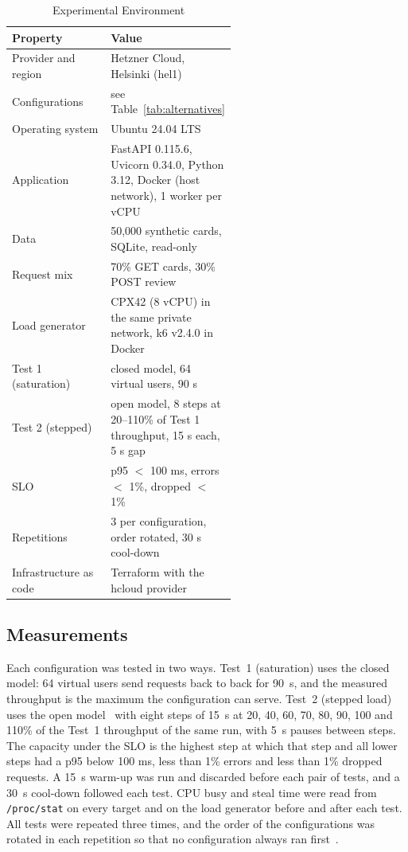 \documentclass[conference,a4paper]{IEEEtran}
\begin{document}
\begin{table}[htbp]
	\caption{Experimental Environment}
	\begin{center}
		\footnotesize
		\begin{tabular}{|l|p{0.56\linewidth}|}
			\hline
			\textbf{Property} & \textbf{Value} \\
			\hline
			Provider and region & Hetzner Cloud, Helsinki (hel1) \\
			\hline
			Configurations & see Table~\ref{tab:alternatives} \\
			\hline
			Operating system & Ubuntu 24.04 LTS \\
			\hline
			Application & FastAPI 0.115.6, Uvicorn 0.34.0, Python 3.12, Docker (host network), 1 worker per vCPU \\
			\hline
			Data & 50,000 synthetic cards, SQLite, read-only \\
			\hline
			Request mix & 70\% GET cards, 30\% POST review \\
			\hline
			Load generator & CPX42 (8 vCPU) in the same private network, k6 v2.4.0 in Docker \\
			\hline
			Test 1 (saturation) & closed model, 64 virtual users, 90 s \\
			\hline
			Test 2 (stepped) & open model, 8 steps at 20--110\% of Test 1 throughput, 15 s each, 5 s gap \\
			\hline
			SLO & p95 $<$ 100 ms, errors $<$ 1\%, dropped $<$ 1\% \\
			\hline
			Repetitions & 3 per configuration, order rotated, 30 s cool-down \\
			\hline
			Infrastructure as code & Terraform with the hcloud provider \\
			\hline
		\end{tabular}
		\label{tab:environment}
	\end{center}
\end{table}

\subsection{Measurements}

Each configuration was tested in two ways. Test~1 (saturation) uses the closed model: 64 virtual users send requests back to back for 90~s, and the measured throughput is the maximum the configuration can serve. Test~2 (stepped load) uses the open model~\cite{k6-car} with eight steps of 15~s at 20, 40, 60, 70, 80, 90, 100 and 110\% of the Test~1 throughput of the same run, with 5~s pauses between steps. The capacity under the SLO is the highest step at which that step and all lower steps had a p95 below 100 ms, less than 1\% errors and less than 1\% dropped requests. A 15~s warm-up was run and discarded before each pair of tests, and a 30~s cool-down followed each test. CPU busy and steal time were read from \texttt{/proc/stat} on every target and on the load generator before and after each test. All tests were repeated three times, and the order of the configurations was rotated in each repetition so that no configuration always ran first~\cite{leitner}.
\end{document}
